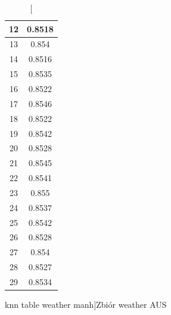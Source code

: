 \documentclass{classrep}
\begin{document}
{{{\begin{table}[!htbp]
\begin{minipage}{.3\textwidth}
\begin{tabular}{|c|c|}
                            12 & 0.8518 \\ \hline
                            13 & 0.854 \\ \hline
                            14 & 0.8516 \\ \hline
                            15 & 0.8535 \\ \hline
                            16 & 0.8522 \\ \hline
                            17 & 0.8546 \\ \hline
                            18 & 0.8522 \\ \hline
                            19 & 0.8542 \\ \hline
                            20 & 0.8528 \\ \hline
                            21 & 0.8545 \\ \hline
                            22 & 0.8541 \\ \hline
                            23 & 0.855 \\ \hline
                            24 & 0.8537 \\ \hline
                            25 & 0.8542 \\ \hline
                            26 & 0.8528 \\ \hline
                            27 & 0.854 \\ \hline
                            28 & 0.8527 \\ \hline
                            29 & 0.8534 \\ \hline
                        \end{tabular}
                        \caption
                        [knn table weather manh]{Zbiór weather AUS}
                        \label{knn_table_weather_manh}
                    \end{minipage}
                \end{table}
                \FloatBarrier

}}}
\end{document}
